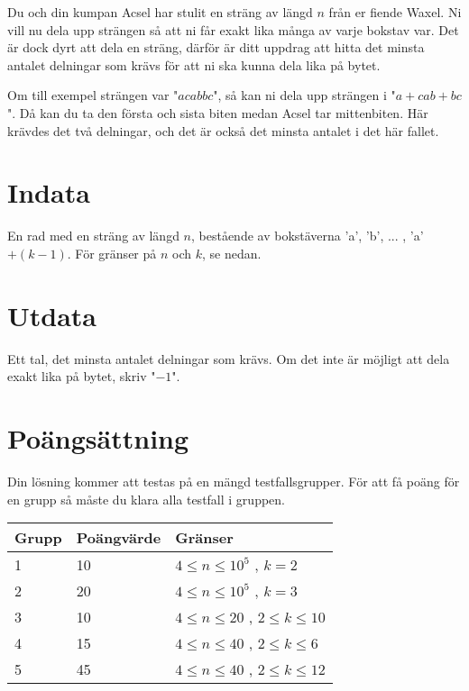 Du och din kumpan Acsel har stulit en sträng av längd $n$ från er fiende Waxel. Ni vill nu dela upp strängen så att ni får
exakt lika många av varje bokstav var. Det är dock dyrt att dela en sträng, därför är ditt uppdrag att hitta det minsta antalet delningar som krävs för att ni ska kunna dela lika på bytet.

Om till exempel strängen var "$\textit{acabbc}$", så kan ni dela upp strängen i
"$\textit{a}+\textit{cab}+\textit{bc}$". Då kan du ta den första och sista biten medan Acsel tar mittenbiten. Här krävdes det två delningar,
och det är också det minsta antalet i det här fallet.

\section*{Indata}
En rad med en sträng av längd $n$, bestående av bokstäverna 'a', 'b', ... , 'a' $+(k-1)$. För gränser på $n$ och $k$, se nedan.
\section*{Utdata}
Ett tal, det minsta antalet delningar som krävs. Om det inte är möjligt att dela exakt lika på bytet, skriv "$-1$".
\section*{Poängsättning}
Din lösning kommer att testas på en mängd testfallsgrupper. För att få poäng för en grupp så måste du klara alla testfall i gruppen.

\noindent
\begin{tabular}{| l | l | l |}
\hline
Grupp & Poängvärde & Gränser \\ \hline
1     & 10         &  $4 \le n \le 10^5$ , $k = 2$ \\ \hline
2     & 20         &  $4 \le n \le 10^5$ , $k = 3$ \\ \hline
3     & 10         &  $4 \le n \le 20$ , $2 \leq k \leq 10$ \\ \hline
4     & 15         &  $4 \le n \le 40$ , $2 \leq k \leq 6$ \\ \hline
5     & 45         &  $4 \le n \le 40$ , $2 \leq k \leq 12$ \\ \hline
\end{tabular}
